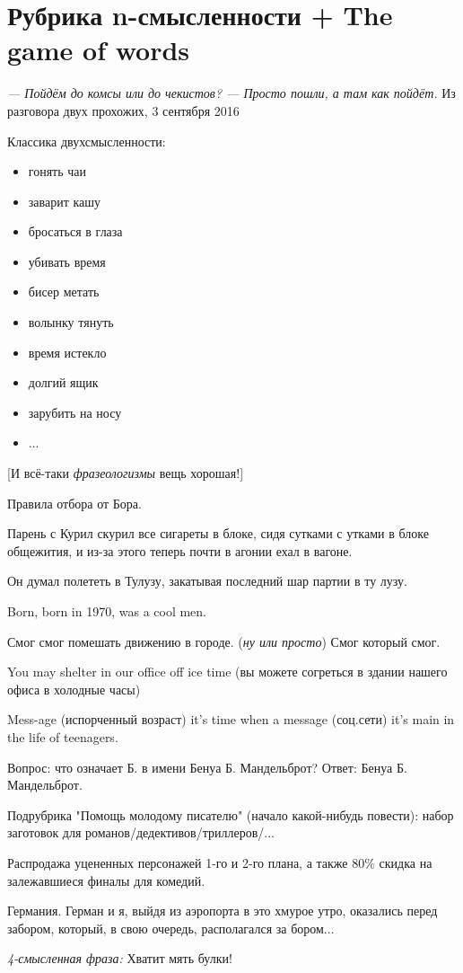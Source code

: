 \section{Рубрика n-смысленности + The game of words}

\begin{displayquote}
    \begin{flushright}
        \emph{--- Пойдём до комсы или до чекистов?
        --- Просто пошли, а там как пойдёт.}
        Из разговора двух прохожих, 3 сентября 2016
    \end{flushright}
\end{displayquote}

Классика двухсмысленности:
\begin{itemize}
    \item гонять чаи
    \item заварит кашу
    \item бросаться в глаза
    \item убивать время
    \item бисер метать
    \item волынку тянуть
    \item время истекло
    \item долгий ящик
    \item зарубить на носу
    \item ...
\end{itemize}

[И всё-таки \emph{фразеологизмы} вещь хорошая!]

Правила отбора от Бора.

Парень с Курил скурил все сигареты в блоке, сидя сутками с утками
в блоке общежития, и из-за этого теперь почти в агонии ехал в
вагоне.

Он думал полететь в Тулузу, закатывая последний шар партии в ту
лузу.

Born, born in 1970, was a cool men.

Смог смог помешать движению в городе. (\emph{ну или просто}) Смог который смог.

You may shelter in our office off ice time (вы можете согреться в здании нашего офиса в холодные часы)

Mess-age (испорченный возраст) it's time when a message (соц.сети) it's main in the life of teenagers.

Вопрос: что означает Б. в имени Бенуа Б. Мандельброт?
Ответ: Бенуа Б. Мандельброт.

Подрубрика "Помощь молодому писателю" (начало какой-нибудь повести): набор заготовок для романов/дедективов/триллеров/...

Распродажа уцененных персонажей 1-го и 2-го плана, а также 80\% скидка на залежавшиеся финалы для комедий.

Германия. Герман и я, выйдя из аэропорта в это хмурое утро, оказались перед забором, который, в свою очередь, располагался за бором...

\emph{4-смысленная фраза:}
Хватит мять булки!
